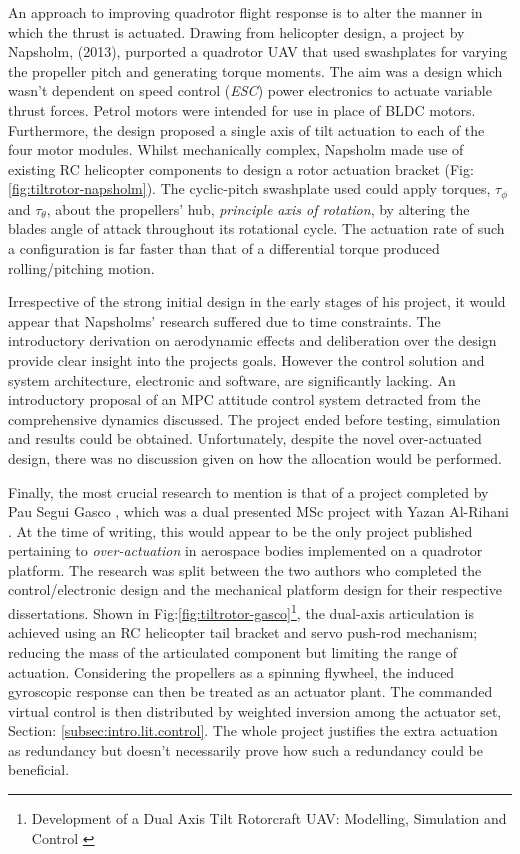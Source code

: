 \par
An approach to improving quadrotor flight response is to alter the manner in which the thrust is actuated. Drawing from helicopter design, a project by Napsholm, (2013)\cite{napsholm}, purported a quadrotor UAV that used swashplates for varying the propeller pitch and generating torque moments. The aim was a design which wasn't dependent on speed control (\emph{ESC}) power electronics to actuate variable thrust forces. Petrol motors were intended for use in place of BLDC motors. Furthermore, the design proposed a single axis of tilt actuation to each of the four motor modules. Whilst mechanically complex, Napsholm made use of existing RC helicopter components to design a rotor actuation bracket (Fig:\ref{fig:tiltrotor-napsholm}). The cyclic-pitch swashplate used \cite{autonomousrobotspitch} could apply torques, $\tau_{\phi}$ and $\tau_{\theta}$, about the propellers' hub, \emph{principle axis of rotation}, by altering the blades angle of attack throughout its rotational cycle. The actuation rate of such a configuration is far faster than that of a differential torque produced rolling/pitching motion.
\par
Irrespective of the strong initial design in the early stages of his project, it would appear that Napsholms' research suffered due to time constraints. The introductory derivation on aerodynamic effects and deliberation over the design provide clear insight into the projects goals. However the control solution and system architecture, electronic and software, are significantly lacking. An introductory proposal of an MPC attitude control system detracted from the comprehensive dynamics discussed. The project ended before testing, simulation and results could be obtained. Unfortunately, despite the novel over-actuated design, there was no discussion given on how the allocation would be performed.
\par
Finally, the most crucial research to mention is that of a project completed by Pau Segui Gasco \cite{tiltgasco}, which was a dual presented MSc project with Yazan Al-Rihani \cite{tiltrihani}. At the time of writing, this would appear to be the only project published pertaining to \emph{over-actuation} in aerospace bodies implemented on a quadrotor platform. The research was split between the two authors who completed the control/electronic design and the mechanical platform design for their respective dissertations. Shown in Fig:\ref{fig:tiltrotor-gasco}\footnote{Development of a Dual Axis Tilt Rotorcraft UAV: Modelling, Simulation and Control \cite{tiltgasco}}, the dual-axis articulation is achieved using an RC helicopter tail bracket and servo push-rod mechanism; reducing the mass of the articulated component but limiting the range of actuation. Considering the propellers as a spinning flywheel, the induced gyroscopic response can then be treated as an actuator plant. The commanded virtual control is then distributed by weighted inversion among the actuator set, Section: \ref{subsec:intro.lit.control}. The whole project justifies the extra actuation as redundancy but doesn't necessarily prove how such a redundancy could be beneficial.

